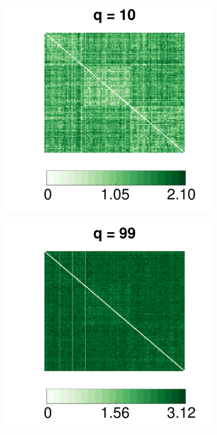 \documentclass[12pt]{article}
\theoremstyle{definition}
\begin{document}
\begin{figure}[H]
\begin{subfigure}[b]{0.23\textwidth}
			\caption{}
			\label{fig:e3}
		\end{subfigure}
		\begin{subfigure}[b]{0.23\textwidth}
			\includegraphics[width=\textwidth]{../Figure/E10.pdf}
			\caption{}
			\label{fig:e10}
		\end{subfigure}
		\begin{subfigure}[b]{0.23\textwidth}
			\includegraphics[width=\textwidth]{../Figure/E99.pdf}

\end{subfigure}
\end{figure}
\end{document}
